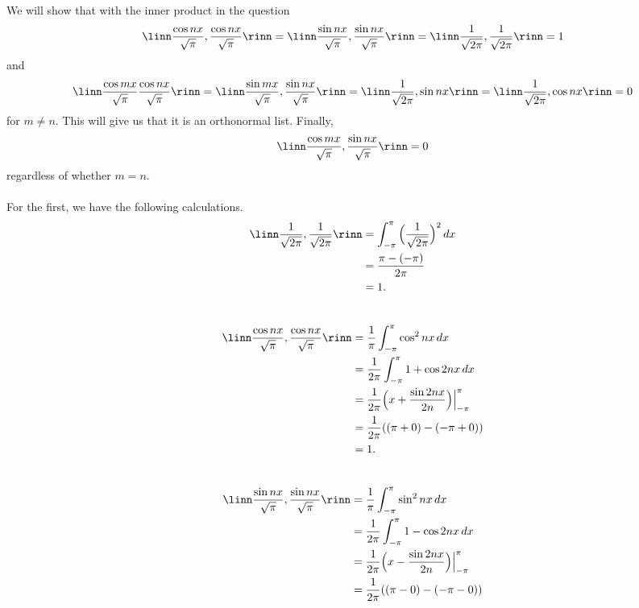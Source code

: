\documentclass[12pt, letterpaper]{hmcpset}
\begin{document}
\begin{solution}
	We will show that with the inner product in the question
	\[
		\linn \frac{\cos{nx}}{\sqrt \pi}, \frac{\cos{nx}}{\sqrt \pi} \rinn = \linn \frac{\sin{nx}}{\sqrt \pi}, \frac{\sin{nx}}{\sqrt{\pi}} \rinn = \linn \frac{1}{\sqrt{2 \pi}}, \frac{1}{\sqrt{2 \pi}} \rinn = 1
	\]
	and
	\[
		\linn \frac{\cos{mx}}{\sqrt{\pi}} \frac{\cos{nx}}{\sqrt \pi} \rinn = \linn \frac{\sin{mx}}{\sqrt \pi}, \frac{\sin{nx}}{\sqrt \pi} \rinn = \linn \frac{1}{\sqrt{2 \pi}}, \sin{nx} \rinn = \linn \frac{1}{\sqrt{2 \pi}}, \cos{nx} \rinn = 0
	\]
	for $m \neq n$. This will give us that it is an orthonormal list.
	Finally,
	\[
		\linn \frac{\cos{mx}}{\sqrt{\pi}}, \frac{\sin{nx}}{\sqrt \pi} \rinn = 0
	\]
	regardless of whether $m = n$.\\\\
	For the first, we have the following calculations.
	\[
		\begin{split}
			\linn \frac{1}{\sqrt{2 \pi}}, \frac{1}{\sqrt{2 \pi}} \rinn & =\int_{-\pi}^\pi \Big ( \frac{1}{\sqrt{2 \pi}} \Big )^2 \, dx \\
										   & = \frac{\pi - (- \pi)}{2 \pi} \\ 
										   & = 1.
		\end{split}
	\]\\
	\[
		\begin{split}
			\linn \frac{\cos{nx}}{\sqrt \pi}, \frac{\cos{nx}}{\sqrt \pi} \rinn & = \frac{1}{\pi}\int_{-\pi}^\pi \cos^2{nx} \, dx \\
						       & = \frac{1}{2 \pi} \int_{-\pi}^\pi 1 + \cos{2nx} \, dx \\ 
						       & = \frac{1}{2 \pi} \Big ( x + \frac{\sin{2nx}}{2n} \Big ) \Big |_{-\pi}^{\pi} \\ 
						       & = \frac{1}{2 \pi} ((\pi + 0) - (-\pi + 0) ) \\
						       & = 1.
		\end{split}
	\]\\
	\[
		\begin{split}
			\linn \frac{\sin{nx}}{\sqrt \pi}, \frac{\sin{nx}}{\sqrt \pi} \rinn & = \frac{1}{\pi} \int_{-\pi}^{\pi} \sin^2{nx} \, dx \\
											   & = \frac{1}{2 \pi} \int_{- \pi}^\pi 1 - \cos{2nx} \, dx \\
											   & = \frac{1}{2 \pi} \Big ( x - \frac{\sin{2nx}}{2n} \Big ) \Big |_{-\pi}^\pi \\
											   & = \frac{1}{2 \pi} ((\pi - 0) - (-\pi - 0)) \\

\end{split}\]
\end{solution}
\end{document}
